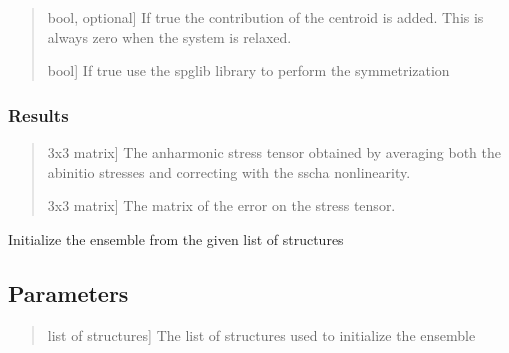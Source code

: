 \documentclass[a4paper,11pt,english]{sphinxmanual}
\begin{document}
\begin{fulllineitems}
\begin{fulllineitems}
\begin{quote}
\begin{description}
\sphinxlineitem{add\_centroid\_contrib}{[}bool, optional{]}
\sphinxAtStartPar
If true the contribution of the centroid is added. This is always zero when
the system is relaxed.

\sphinxlineitem{use\_spglib}{[}bool{]}
\sphinxAtStartPar
If true use the spglib library to perform the symmetrization

\end{description}
\end{quote}


\subsubsection{Results}
\label{\detokenize{apireference:id15}}\begin{quote}
\begin{description}
\sphinxlineitem{stress\_tensor}{[}3x3 matrix{]}
\sphinxAtStartPar
The anharmonic stress tensor obtained by averaging both the ab\sphinxhyphen{}initio
stresses and correcting with the sscha non\sphinxhyphen{}linearity.

\sphinxlineitem{err\_stress}{[}3x3 matrix{]}
\sphinxAtStartPar
The matrix of the error on the stress tensor.

\end{description}
\end{quote}

\end{fulllineitems}


\begin{fulllineitems}
\label{\detokenize{apireference:sscha.Ensemble.Ensemble.init_from_structures}}
\pysigstartsignatures
{}
\pysigstopsignatures
\sphinxAtStartPar
Initialize the ensemble from the given list of structures


\subsection{Parameters}
\label{\detokenize{apireference:id16}}\begin{quote}
\begin{description}
\sphinxlineitem{structures}{[}list of structures{]}
\sphinxAtStartPar
The list of structures used to initialize the ensemble


\end{description}
\end{quote}
\end{fulllineitems}
\end{fulllineitems}
\end{document}
